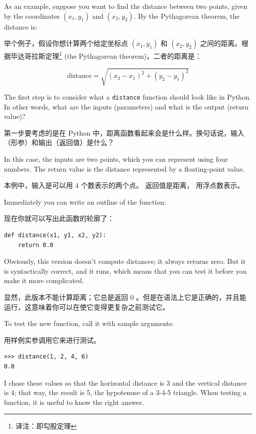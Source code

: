 As an example, suppose you want to find the distance between two
points, given by the coordinates $(x_1, y_1)$ and $(x_2, y_2)$.
By the Pythagorean theorem, the distance is:

举个例子，假设你想计算两个给定坐标点 $(x_1, y_1)$ 和 $(x_2, y_2)$ 之间的距离。根据毕达哥拉斯定理\footnote{译注：即勾股定理} (the Pythagorean theorem)，二者的距离是：


\begin{displaymath}
\mathrm{distance} = \sqrt{(x_2 - x_1)^2 + (y_2 - y_1)^2}
\end{displaymath}

%
The first step is to consider what a {\tt distance} function should
look like in Python.  In other words, what are the inputs (parameters)
and what is the output (return value)?

第一步要考虑的是在 Python 中，距离函数看起来会是什么样。换句话说，输入（形参）和输出（返回值）是什么？

In this case, the inputs are two points, which you can represent
using four numbers.  The return value is the distance represented by
a floating-point value.

本例中，输入是可以用 4 个数表示的两个点。 返回值是距离， 用浮点数表示。

Immediately you can write an outline of the function:

现在你就可以写出此函数的轮廓了：

\begin{lstlisting}
def distance(x1, y1, x2, y2):
    return 0.0
\end{lstlisting}

%
Obviously, this version doesn't compute distances; it always returns
zero.  But it is syntactically correct, and it runs, which means that
you can test it before you make it more complicated.

显然，此版本不能计算距离；它总是返回 0 。但是在语法上它是正确的，并且能运行，这意味着你可以在使它变得更复杂之前测试它。

To test the new function, call it with sample arguments:

用样例实参调用它来进行测试。

\begin{lstlisting}
>>> distance(1, 2, 4, 6)
0.0
\end{lstlisting}

%
I chose these values so that the horizontal distance is 3 and the
vertical distance is 4; that way, the result is 5, the hypotenuse
of a 3-4-5 triangle. When testing a function, it is
useful to know the right answer.

